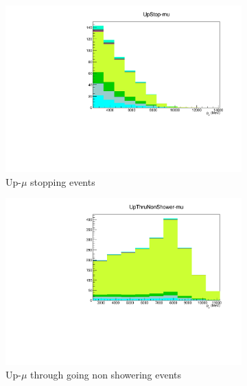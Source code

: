 \begin{figure}[ht]
    \begin{subfigure}[t]{0.49\textwidth}
    \includegraphics[width=\textwidth, trim= 0 0 0 30, clip]{Figures/Selections/AtmosphericByMode/UpStop-mu_LepMom.pdf}
    \caption{Up-$\mu$ stopping events}
    \end{subfigure}
    \begin{subfigure}[t]{0.49\textwidth}
    \includegraphics[width=\textwidth, trim= 0 0 0 30, clip]{Figures/Selections/AtmosphericByMode/UpThruNonShower-mu_LepMom.pdf}
    \caption{Up-$\mu$ through going non showering events}
    \end{subfigure}
    \begin{subfigure}[t]{0.49\textwidth}

\end{subfigure}
\end{figure}
